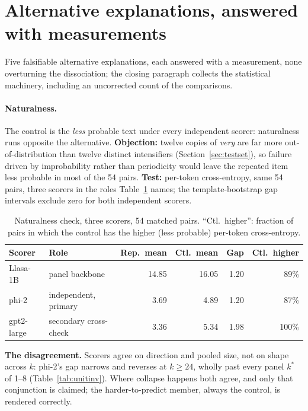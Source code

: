 \section{Alternative explanations, answered with measurements}
\label{sec:alternatives}

Five falsifiable alternative explanations, each answered with a measurement, none overturning
the dissociation; the closing paragraph collects the statistical machinery, including an
uncorrected count of the comparisons.

\paragraph{Naturalness.} The control is the \emph{less} probable text under every independent
scorer: naturalness runs opposite the alternative. \textbf{Objection:} twelve copies of
\emph{very} are far more out-of-distribution than twelve distinct intensifiers
(Section~\ref{sec:testset}), so failure driven by improbability rather than periodicity would
leave the repeated item less probable in most of the 54 pairs. \textbf{Test:} per-token
cross-entropy, same 54 pairs, three scorers in the roles Table~\ref{tab:naturalness} names; the
template-bootstrap gap intervals exclude zero for both independent scorers.

\begin{table}[htbp]
\centering
\caption{Naturalness check, three scorers, 54 matched pairs. ``Ctl.\ higher'': fraction of pairs in
which the control has the higher (less probable) per-token cross-entropy.}
\label{tab:naturalness}
\small
\begin{tabular}{@{}lp{2.6cm}rrrr@{}}
\toprule
Scorer & Role & Rep.\ mean & Ctl.\ mean & Gap & Ctl.\ higher \\
\midrule
Llasa-1B & panel backbone & 14.85 & 16.05 & 1.20 & 89\% \\
phi-2 & independent, primary & 3.69 & 4.89 & 1.20 & 87\% \\
gpt2-large & secondary cross-check & 3.36 & 5.34 & 1.98 & 100\% \\
\bottomrule
\end{tabular}
\end{table}

\noindent\textbf{The disagreement.} Scorers agree on direction and pooled size, not on shape
across $k$: phi-2's gap narrows and reverses at $k\ge24$, wholly past every panel $k^\ast$ of
1--8 (Table~\ref{tab:unitinv}). Where collapse happens both agree, and only that conjunction is
claimed; the harder-to-predict member, always the control, is rendered correctly.

